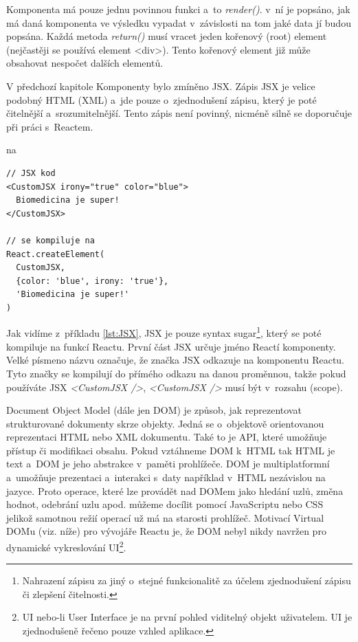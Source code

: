 Komponenta má pouze jednu povinnou funkci a~to \textit{render()}. v~ní je popsáno, jak má daná komponenta ve výsledku vypadat v~závislosti na tom jaké data jí budou popsána. Každá metoda \textit{return()} musí vracet jeden kořenový (root)  element (nejčastěji se používá element <div>). Tento kořenový element již může obsahovat nespočet dalších elementů. \\


V předchozí kapitole Komponenty bylo zmíněno JSX. Zápis JSX je velice podobný HTML (XML) a~jde pouze o~zjednodušení zápisu, který je poté čitelnější a~srozumitelnější. Tento zápis není povinný, nicméně silně se doporučuje při práci s~Reactem. 


na
\begin{lstlisting}[numbers=none, caption=Ukázka JSX a~jeho transkompilaci., label=lst:JSX]
// JSX kod
<CustomJSX irony="true" color="blue">
  Biomedicina je super!
</CustomJSX>

// se kompiluje na
React.createElement(
  CustomJSX,
  {color: 'blue', irony: 'true'},
  'Biomedicina je super!'
)
\end{lstlisting}


Jak vidíme z~příkladu \ref{lst:JSX}, JSX je pouze syntax sugar\footnote{Nahrazení zápisu za jiný o~stejné funkcionalitě za účelem zjednodušení zápisu či zlepšení čitelnosti.}, který se poté kompiluje na funkcí Reactu. První část JSX určuje jméno Reactí komponenty. Velké písmeno názvu označuje, že značka JSX odkazuje na komponentu Reactu. Tyto značky se kompilují do přímého odkazu na danou proměnnou, takže pokud používáte JSX \textit{<CustomJSX />}, \textit{<CustomJSX />} musí být v~rozsahu (scope). \\


Document Object Model (dále jen DOM) je způsob, jak reprezentovat strukturované dokumenty skrze objekty. Jedná se o~objektově orientovanou reprezentaci HTML nebo XML dokumentu. Také to je API, které umožňuje přístup či modifikaci obsahu. Pokud vztáhneme DOM k~HTML tak HTML je text a~DOM je jeho abstrakce v~paměti prohlížeče. DOM je multiplatformní a~umožňuje prezentaci a~interakci s~daty například v~HTML nezávislou na jazyce. Proto operace, které lze provádět nad DOMem jako hledání uzlů, změna hodnot, odebrání uzlu apod. můžeme docílit pomocí JavaScriptu nebo CSS jelikož samotnou režií operací už má na starosti prohlížeč. Motivací Virtual DOMu (viz. níže) pro vývojáře Reactu je, že DOM nebyl nikdy navržen pro dynamické vykreslování UI\footnote{UI nebo-li User Interface je na první pohled viditelný objekt uživatelem. UI je zjednodušeně řečeno pouze vzhled aplikace.}. \\

